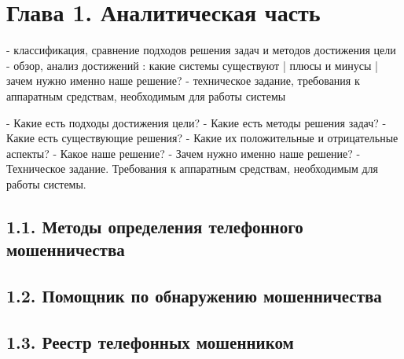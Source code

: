 \section*{\centering Глава 1. Аналитическая часть}

- классификация, сравнение подходов решения задач и методов достижения цели
- обзор, анализ достижений : какие системы существуют | плюсы и минусы | зачем нужно именно наше решение?
- техническое задание, требования к аппаратным средствам, необходимым для работы системы

- Какие есть подходы достижения цели?
- Какие есть методы решения задач?
- Какие есть существующие решения?
- Какие их положительные и отрицательные аспекты?
- Какое наше решение?
- Зачем нужно именно наше решение?
- Техническое задание. Требования к аппаратным средствам, необходимым для работы системы.

\subsection*{1.1. Методы определения телефонного мошенничества}

\subsection*{1.2. Помощник по обнаружению мошенничества}

\subsection*{1.3. Реестр телефонных мошенником}

\newpage

